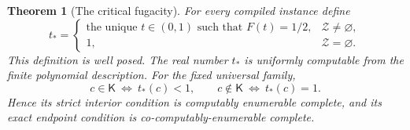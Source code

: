 \documentclass[11pt,letterpaper]{article}
\newtheorem{theorem}{Theorem}[section]
\theoremstyle{definition}
\theoremstyle{remark}
\begin{document}
\begin{theorem}[The critical fugacity]\label{ste:ta:thm:critical}
For every compiled instance define
\begin{equation}\label{ste:ta:eq:tstar}
t_*=
\begin{cases}
\text{the unique }t\in(0,1)\text{ such that }F(t)=1/2,
&\mathcal Z\ne\varnothing,\\
1,&\mathcal Z=\varnothing.
\end{cases}
\end{equation}
This definition is well posed. The real number $t_*$ is uniformly computable from the finite polynomial description. For the fixed universal family,
\begin{equation}\label{ste:ta:eq:endpoint}
c\in\mathsf K\ \Longleftrightarrow\ t_*(c)<1,
\qquad
c\notin\mathsf K\ \Longleftrightarrow\ t_*(c)=1.
\end{equation}
Hence its strict interior condition is computably enumerable complete, and its exact endpoint condition is co-computably-enumerable complete.
\end{theorem}
\end{document}
